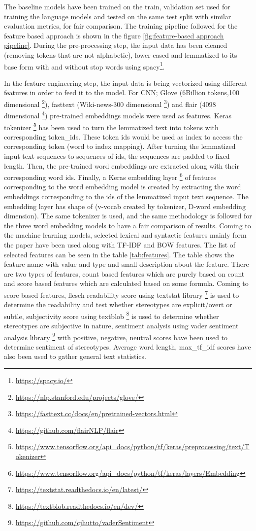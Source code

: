 The baseline models have been trained on the train, validation set used for training the language models and tested on the same test split with similar evaluation metrics, for fair comparison. The training pipeline followed for the feature based approach is shown in the figure \ref{fig:feature-based approach pipeline}. During the pre-processing step, the input data has been cleaned (removing tokens that are not alphabetic), lower cased and  lemmatized to its base form with and without stop words using spacy\footnote{\url{https://spacy.io/}}. 


In the feature engineering  step, the input data is being vectorized using different features in order to feed it to the model. For CNN; Glove (6Billion tokens,100 dimensional \footnote{\url{https://nlp.stanford.edu/projects/glove/}}), fasttext (Wiki-news-300 dimensional \footnote{\url{https://fasttext.cc/docs/en/pretrained-vectors.html}}) and flair (4098 dimensional \footnote{\url{https://github.com/flairNLP/flair}}) pre-trained embeddings models were used as features. Keras tokenizer \footnote{\url{https://www.tensorflow.org/api_docs/python/tf/keras/preprocessing/text/Tokenizer}} has been used to turn the lemmatized text into tokens with corresponding token\_ids. These token ids would be used as index to access the corresponding token (word to index mapping). After turning the lemmatized input text sequences to sequences of ids, the sequences are padded to fixed length. Then, the pre-trained word embeddings are extracted along with their corresponding word ids. Finally, a Keras embedding layer \footnote{\url{https://www.tensorflow.org/api_docs/python/tf/keras/layers/Embedding}} of features corresponding to the word embedding model is created by extracting the word embeddings corresponding to the ids of the lemmatized input text sequence. The embedding layer has shape of (v-vocab created by tokenizer, D-word embedding dimension). The same tokenizer is used, and the same methodology is followed for the three word embedding models to have a fair comparison of results. Coming to the machine learning models, selected lexical and syntactic features  mainly form the paper \cite{recasens2013linguistic}  have been used along with TF-IDF and BOW features. The list of selected features can be seen in the table \ref{tab:features}. The table shows the feature name with value and type and small description about the feature. There are two types of features, count based features which are purely based on count and score based features which are calculated based on some formula. Coming to score based features, flesch readability score \cite{flesch1948new} using textstat library \footnote{\url{https://textstat.readthedocs.io/en/latest/}} is used to determine the readability and test whether stereotypes are explicit/overt or subtle, subjectivity score using textblob \footnote{\url{https://textblob.readthedocs.io/en/dev/}} is used to determine whether stereotypes are subjective in nature, sentiment analysis using vader sentiment analysis library \footnote{\url{https://github.com/cjhutto/vaderSentiment}} with positive, negative, neutral scores have been used to determine sentiment of stereotypes. Average word length, max\_tf\_idf scores have also been used to gather general text statistics. 

